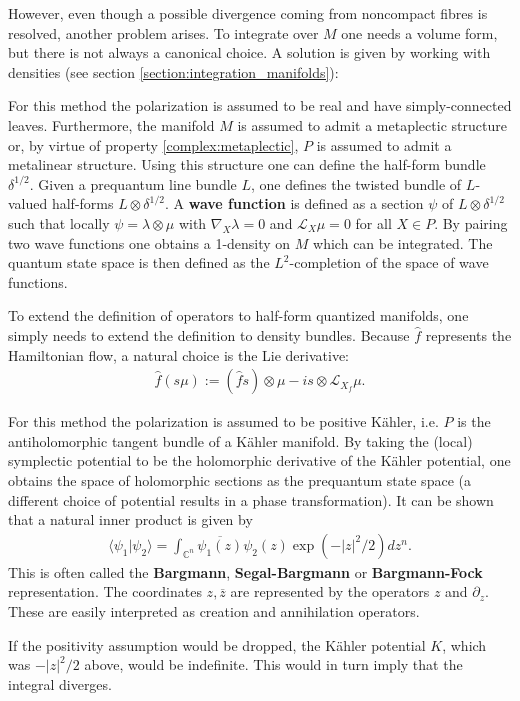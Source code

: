     However, even though a possible divergence coming from noncompact fibres is resolved, another problem arises. To integrate over $M$ one needs a volume form, but there is not always a canonical choice. A solution is given by working with densities (see section \ref{section:integration_manifolds}):
    \begin{method}
        For this method the polarization is assumed to be real and have simply-connected leaves. Furthermore, the manifold $M$ is assumed to admit a metaplectic structure or, by virtue of property \ref{complex:metaplectic}, $P$ is assumed to admit a metalinear structure. Using this structure one can define the half-form bundle $\delta^{1/2}$. Given a prequantum line bundle $L$, one defines the twisted bundle of $L$-valued half-forms $L\otimes\delta^{1/2}$. A \textbf{wave function} is defined as a section $\psi$ of $L\otimes\delta^{1/2}$ such that locally $\psi=\lambda\otimes\mu$ with $\nabla_X\lambda=0$ and $\mathcal{L}_X\mu=0$ for all $X\in P$. By pairing two wave functions one obtains a 1-density on $M$ which can be integrated. The quantum state space is then defined as the $L^2$-completion of the space of wave functions.

        To extend the definition of operators to half-form quantized manifolds, one simply needs to extend the definition to density bundles. Because $\hat{f}$ represents the Hamiltonian flow, a natural choice is the Lie derivative:
        \begin{gather}
            \hat{f}(s\mu) := (\hat{f}s)\otimes\mu - is\otimes\mathcal{L}_{X_f}\mu.
        \end{gather}
    \end{method}

    \begin{example}
        For this method the polarization is assumed to be positive K\"ahler, i.e. $P$ is the antiholomorphic tangent bundle of a K\"ahler manifold. By taking the (local) symplectic potential to be the holomorphic derivative of the K\"ahler potential, one obtains the space of holomorphic sections as the prequantum state space (a different choice of potential results in a phase transformation). It can be shown that a natural inner product is given by
        \begin{gather}
            \langle \psi_1|\psi_2 \rangle = \int_{\mathbb{C}^n}\overline{\psi_1(z)}\psi_2(z)\exp(-|z|^2/2)dz^n.
        \end{gather}
        This is often called the \textbf{Bargmann}, \textbf{Segal-Bargmann} or \textbf{Bargmann-Fock} representation. The coordinates $z,\overline{z}$ are represented by the operators $z$ and $\partial_z$. These are easily interpreted as creation and annihilation operators.
    \end{example}
    \begin{remark}
        If the positivity assumption would be dropped, the K\"ahler potential $K$, which was $-|z|^2/2$ above, would be indefinite. This would in turn imply that the integral diverges.
    \end{remark}


